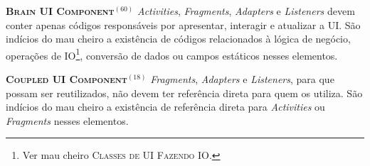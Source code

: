   \noindent
  \textsc{\textbf{{\small Brain UI Component}}}$^{(60)}$ \textit{Activities}, \textit{Fragments}, \textit{Adapters} e \textit{Listeners} devem conter apenas códigos responsáveis por apresentar, interagir e atualizar a UI. São indícios do mau cheiro a existência de códigos relacionados à lógica de negócio, operações de IO\footnote{Ver mau cheiro \textsc{\small Classes de UI Fazendo IO}.}, conversão de dados ou campos estáticos nesses elementos.


  \noindent
  \textbf{\textsc{{\small Coupled UI Component}}}$^{(18)}$ \textit{Fragments}, \textit{Adapters} e \textit{Listeners}, para que possam ser reutilizados, não devem ter referência direta para quem os utiliza. São indícios do mau cheiro a existência de referência direta para \textit{Activities} ou \textit{Fragments} nesses elementos.


